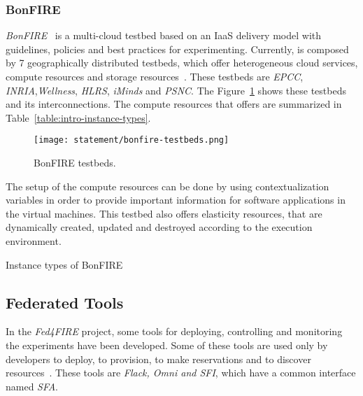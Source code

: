 \subsubsection{BonFIRE}

\emph{BonFIRE}~\cite{Hume2012} is a multi-cloud testbed based on an \ac{IaaS}
delivery model with guidelines, policies and best practices for
experimenting. Currently, \bonfire is composed by 7 geographically distributed
testbeds, which offer heterogeneous cloud services, compute resources and
storage resources~\cite{BonFIRE2014}. These testbeds are \emph{EPCC},\emph{
  INRIA},\emph{Wellness},\emph{ HLRS}, \emph{iMinds} and \emph{PSNC}. The
Figure~\ref{fig:intr-bonfire-testbeds} shows these testbeds and its
interconnections. The compute resources that \bonfire offers are summarized in Table~\ref{table:intro-instance-types}.


\begin{figure}[!h]
\begin{center}
\texttt{[image: statement/bonfire-testbeds.png]}
\caption{BonFIRE testbeds.}
\label{fig:intr-bonfire-testbeds}
\end{center}
\end{figure}

The setup of the compute resources can be done by using contextualization variables in
order to provide important information for software applications in the virtual
machines.
This testbed also offers elasticity resources, that are dynamically created,
updated and destroyed according to the execution environment.

\begin{table}[H]
  \centering
  {\small
  
  }
  \caption{Instance types of BonFIRE}
  \label{table:intro-instance-types}
\end{table}


\subsection{Federated Tools}
\label{subsec:federatedtools}
In the \emph{Fed4FIRE} project, some tools for deploying, controlling and
monitoring the experiments have been developed.
Some of these tools are used only by developers to deploy, to provision, to
make reservations and to discover resources~\cite{Fed4FIRE2014}. These tools are \emph{Flack, Omni
  and SFI}, which have a common interface named \emph{SFA}.

